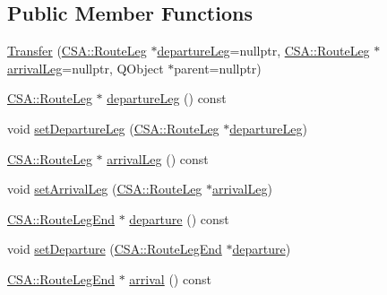 \subsection*{Public Member Functions}
\begin{DoxyCompactItemize}
\item 
\mbox{\hyperlink{classCSA_1_1Transfer_a899f767d520735fccc3389da77d8f7ae}{Transfer}} (\mbox{\hyperlink{classCSA_1_1RouteLeg}{C\+S\+A\+::\+Route\+Leg}} $\ast$\mbox{\hyperlink{classCSA_1_1Transfer_a7f2d02a0a1fe7ca96f57fc7864ebfdb8}{departure\+Leg}}=nullptr, \mbox{\hyperlink{classCSA_1_1RouteLeg}{C\+S\+A\+::\+Route\+Leg}} $\ast$\mbox{\hyperlink{classCSA_1_1Transfer_acf5d711e3c206ff0da0cae8146a08beb}{arrival\+Leg}}=nullptr, Q\+Object $\ast$parent=nullptr)
\item 
\mbox{\hyperlink{classCSA_1_1RouteLeg}{C\+S\+A\+::\+Route\+Leg}} $\ast$ \mbox{\hyperlink{classCSA_1_1Transfer_a7f2d02a0a1fe7ca96f57fc7864ebfdb8}{departure\+Leg}} () const
\item 
void \mbox{\hyperlink{classCSA_1_1Transfer_a70a78662a0ef74bb5d88b7796130f001}{set\+Departure\+Leg}} (\mbox{\hyperlink{classCSA_1_1RouteLeg}{C\+S\+A\+::\+Route\+Leg}} $\ast$\mbox{\hyperlink{classCSA_1_1Transfer_a7f2d02a0a1fe7ca96f57fc7864ebfdb8}{departure\+Leg}})
\item 
\mbox{\hyperlink{classCSA_1_1RouteLeg}{C\+S\+A\+::\+Route\+Leg}} $\ast$ \mbox{\hyperlink{classCSA_1_1Transfer_acf5d711e3c206ff0da0cae8146a08beb}{arrival\+Leg}} () const
\item 
void \mbox{\hyperlink{classCSA_1_1Transfer_a3143da004508fa9c75e265054001e7bf}{set\+Arrival\+Leg}} (\mbox{\hyperlink{classCSA_1_1RouteLeg}{C\+S\+A\+::\+Route\+Leg}} $\ast$\mbox{\hyperlink{classCSA_1_1Transfer_acf5d711e3c206ff0da0cae8146a08beb}{arrival\+Leg}})
\item 
\mbox{\hyperlink{classCSA_1_1RouteLegEnd}{C\+S\+A\+::\+Route\+Leg\+End}} $\ast$ \mbox{\hyperlink{classCSA_1_1Transfer_a1442b93dece142706ed8657f1fa9e093}{departure}} () const
\item 
void \mbox{\hyperlink{classCSA_1_1Transfer_a284812274e48e89abae09e8ab37e5670}{set\+Departure}} (\mbox{\hyperlink{classCSA_1_1RouteLegEnd}{C\+S\+A\+::\+Route\+Leg\+End}} $\ast$\mbox{\hyperlink{classCSA_1_1Transfer_a1442b93dece142706ed8657f1fa9e093}{departure}})
\item 
\mbox{\hyperlink{classCSA_1_1RouteLegEnd}{C\+S\+A\+::\+Route\+Leg\+End}} $\ast$ \mbox{\hyperlink{classCSA_1_1Transfer_a1b651e08402cf33cf12d65ad9b6f8011}{arrival}} () const
\item 

\end{DoxyCompactItemize}
